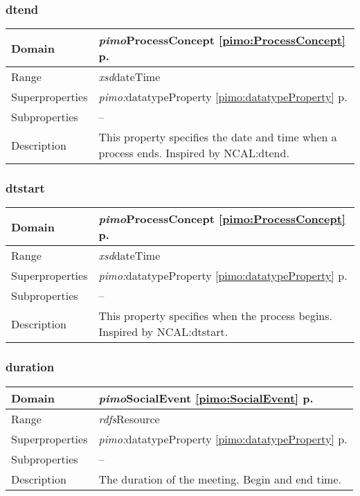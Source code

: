 \subsubsection{dtend} 
\label{pimo:dtend}
\begin{longtable}{|p{}|p{}|}
 \hline 
Domain & {\it pimo}\hspace{1pt}ProcessConcept \ref{pimo:ProcessConcept} p. \pageref{pimo:ProcessConcept}\\ \hline 
Range & {\it xsd}\hspace{1pt}dateTime\\ \hline 
Superproperties & {\it pimo:}datatypeProperty \ref{pimo:datatypeProperty} p. \pageref{pimo:datatypeProperty}\\ \hline 
Subproperties & --\\ \hline 
Description & This property specifies the date and time when a process ends. Inspired by NCAL:dtend.\\ \hline 
\end{longtable}


\subsubsection{dtstart} 
\label{pimo:dtstart}
\begin{longtable}{|p{}|p{}|}
 \hline 
Domain & {\it pimo}\hspace{1pt}ProcessConcept \ref{pimo:ProcessConcept} p. \pageref{pimo:ProcessConcept}\\ \hline 
Range & {\it xsd}\hspace{1pt}dateTime\\ \hline 
Superproperties & {\it pimo:}datatypeProperty \ref{pimo:datatypeProperty} p. \pageref{pimo:datatypeProperty}\\ \hline 
Subproperties & --\\ \hline 
Description & This property specifies when the process begins. Inspired by NCAL:dtstart.\\ \hline 
\end{longtable}


\subsubsection{duration} 
\label{pimo:duration}
\begin{longtable}{|p{}|p{}|}
 \hline 
Domain & {\it pimo}\hspace{1pt}SocialEvent \ref{pimo:SocialEvent} p. \pageref{pimo:SocialEvent}\\ \hline 
Range & {\it rdfs}\hspace{1pt}Resource\\ \hline 
Superproperties & {\it pimo:}datatypeProperty \ref{pimo:datatypeProperty} p. \pageref{pimo:datatypeProperty}\\ \hline 
Subproperties & --\\ \hline 
Description & The duration of the meeting. Begin and end time.\\ \hline 
\end{longtable}


